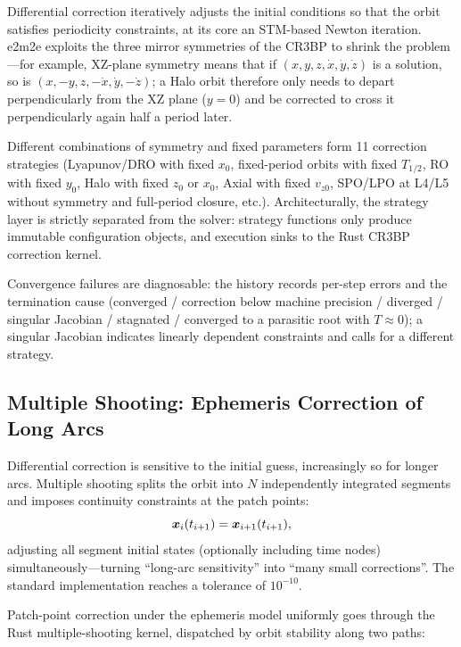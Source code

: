 Differential correction iteratively adjusts the initial conditions so that
the orbit satisfies periodicity constraints, at its core an STM-based Newton
iteration. e2m2e exploits the three mirror symmetries of the CR3BP to shrink
the problem---for example, XZ-plane symmetry means that if
$(x, y, z, \dot x, \dot y, \dot z)$ is a solution, so is
$(x, -y, z, -\dot x, \dot y, -\dot z)$; a Halo orbit therefore only needs to
depart perpendicularly from the XZ plane ($y = 0$) and be corrected to cross
it perpendicularly again half a period later.

Different combinations of symmetry and fixed parameters form 11 correction
strategies (Lyapunov/DRO with fixed $x_0$, fixed-period orbits with fixed
$T_{1/2}$, RO with fixed $y_0$, Halo with fixed $z_0$ or $x_0$, Axial with
fixed $v_{z0}$, SPO/LPO at L4/L5 without symmetry and full-period closure,
etc.). Architecturally, the strategy layer is strictly separated from the
solver: strategy functions only produce immutable configuration objects, and
execution sinks to the Rust CR3BP correction kernel.

Convergence failures are diagnosable: the history records per-step errors and
the termination cause (converged / correction below machine precision /
diverged / singular Jacobian / stagnated / converged to a parasitic root with
$T \approx 0$); a singular Jacobian indicates linearly dependent constraints
and calls for a different strategy.

\subsection{Multiple Shooting: Ephemeris Correction of Long Arcs}

Differential correction is sensitive to the initial guess, increasingly so
for longer arcs. Multiple shooting splits the orbit into $N$ independently
integrated segments and imposes continuity constraints at the patch points:
\begin{equation}
  \bm{x}_i(t_{i+1}) = \bm{x}_{i+1}(t_{i+1}),
\end{equation}
adjusting all segment initial states (optionally including time nodes)
simultaneously---turning ``long-arc sensitivity'' into ``many small
corrections''. The standard implementation reaches a tolerance of $10^{-10}$.

Patch-point correction under the ephemeris model uniformly goes through the
Rust multiple-shooting kernel, dispatched by orbit stability along two paths:

